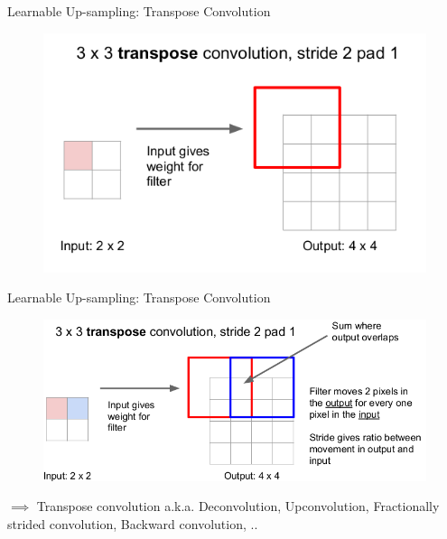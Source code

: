 \documentclass[aspectratio=169]{beamer}
\begin{document}
\begin{frame}{Learnable Up-sampling: Transpose Convolution}
\begin{figure}
    \centering
    \includegraphics[scale=.4]{demo/figs/tconv8.png}
\end{figure}
\end{frame}

\begin{frame}{Learnable Up-sampling: Transpose Convolution}
\begin{figure}
    \centering
    \includegraphics[scale=.4]{demo/figs/tconv11.png}
\end{figure}
$\implies$ Transpose convolution a.k.a. Deconvolution, Upconvolution, Fractionally strided convolution, Backward convolution, ..
\end{frame}
\end{document}
